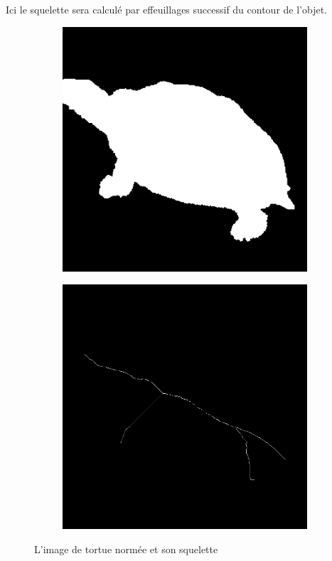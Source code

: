 \documentclass{article}
\theoremstyle{definition}
\begin{document}
    Ici le squelette sera calculé par effeuillages successif du contour de l'objet.
    
     \begin{figure}[!h]
	\centering
	\begin{subfigure}{.45\textwidth}
	  \centering
	  \includegraphics[scale=0.25]{Illustrations/turtle.png}
	  \label{pocket-non-rempli}
	\end{subfigure}
	\begin{subfigure}{.45\textwidth}
	  \centering
	  \includegraphics[scale=0.25]{Illustrations/turtlesk.png}
	\label{pocket-rempli}
	\end{subfigure}
	\caption{L'image de tortue normée et son squelette}
	\label{skelton}
      \end{figure}
      
\end{document}
